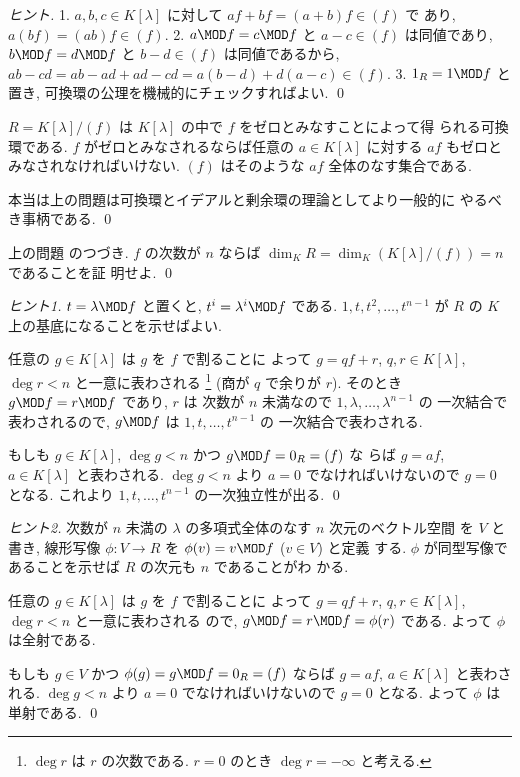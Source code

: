 \documentclass[12pt,twoside]{jarticle}
\begin{document}
\begin{proof}[ヒント]
  1. $a,b,c\in K[\lambda]$ に対して $af+bf=(a+b)f\in(f)$ で
  あり, $a(bf) = (ab)f\in(f)$. 
  2. $a\MOD f=c\MOD f$ と $a-c\in(f)$ は同値であり,
  $b\MOD f=d\MOD f$ と $b-d\in(f)$ は同値であるから,
  $ab-cd=ab-ad+ad-cd=a(b-d)+d(a-c)\in(f)$.
  3. $1_R=1\MOD f$ と置き, 可換環の公理を機械的にチェックすればよい.
  \qed
\end{proof}

\begin{guide}
  $R=K[\lambda]/(f)$ は $K[\lambda]$ の中で $f$ をゼロとみなすことによって得
  られる可換環である.  $f$ がゼロとみなされるならば任意の $a\in K[\lambda]$ 
  に対する $af$ もゼロとみなされなければいけない.
  $(f)$ はそのような $af$ 全体のなす集合である.

  本当は上の問題は可換環とイデアルと剰余環の理論としてより一般的に
  やるべき事柄である.
  \qed
\end{guide}


\begin{question}[10点]
  \label{q:K[x]/(f)-2}
  上の問題  のつづき.
  $f$ の次数が $n$ ならば $\dim_K R=\dim_K(K[\lambda]/(f))=n$ であることを証
  明せよ. \qed
\end{question}

\begin{proof}[ヒント1]
  $t=\lambda\MOD f$ と置くと, $t^i=\lambda^i\MOD f$ である.
  $1,t,t^2,\ldots,t^{n-1}$ が $R$ の $K$ 上の基底になることを示せばよい.

  任意の $g\in K[\lambda]$ は $g$ を $f$ で割ることに
  よって $g=qf+r$, $q,r\in K[\lambda]$, $\deg r<n$ と一意に表わされる%
  \footnote{$\deg r$ は $r$ の次数である.
    $r=0$ のとき $\deg r = -\infty$ と考える.}
  (商が $q$ で余りが $r$).
  そのとき $g\MOD f=r\MOD f$ であり, $r$ は
  次数が $n$ 未満なので $1,\lambda,\ldots,\lambda^{n-1}$ の
  一次結合で表わされるので, $g\MOD f$ は $1,t,\ldots,t^{n-1}$ の
  一次結合で表わされる.

  もしも $g\in K[\lambda]$, $\deg g<n$ かつ $g\MOD f=0_R=(f)$ な
  らば $g=af$, $a\in K[\lambda]$ と表わされる.
  $\deg g<n$ より $a=0$ でなければいけないので $g=0$ となる.  
  これより $1,t,\ldots,t^{n-1}$ の一次独立性が出る.
  \qed
\end{proof}

\begin{proof}[ヒント2]
  次数が $n$ 未満の $\lambda$ の多項式全体のなす $n$ 次元のベクトル空間
  を $V$ と書き, 線形写像 $\phi:V\to R$ を $\phi(v)=v\MOD f$ ($v\in V$) と定義
  する.  $\phi$ が同型写像であることを示せば $R$ の次元も $n$ であることがわ
  かる.

  任意の $g\in K[\lambda]$ は $g$ を $f$ で割ることに
  よって $g=qf+r$, $q,r\in K[\lambda]$, $\deg r<n$ と一意に表わされる
  ので, $g\MOD f=r\MOD f=\phi(r)$ である.  よって $\phi$ は全射である.

  もしも $g\in V$ かつ $\phi(g) = g\MOD f=0_R=(f)$ 
  ならば $g=af$, $a\in K[\lambda]$ と表わされる.
  $\deg g<n$ より $a=0$ でなければいけないので $g=0$ となる.  
  よって $\phi$ は単射である.
  \qed
\end{proof}
\end{document}
